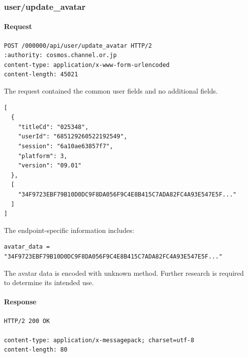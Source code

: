\subsubsection{user/update\_avatar}
\label{subsec:api_user_update_avatar}

\paragraph{Request}

\begin{lstlisting}
POST /000000/api/user/update_avatar HTTP/2
:authority: cosmos.channel.or.jp
content-type: application/x-www-form-urlencoded
content-length: 45021
\end{lstlisting}

The request contained the common user fields and no additional fields.

\begin{lstlisting}
[
  {
    "titleCd": "025348",
    "userId": "685129260522192549",
    "session": "6a10ae63857f7",
    "platform": 3,
    "version": "09.01"
  },
  [
    "34F9723EBF79B10D0DC9F8DA056F9C4E8B415C7ADA82FC4A93E547E5F..."
  ]
]
\end{lstlisting}

The endpoint-specific information includes:

\begin{lstlisting}
avatar_data = "34F9723EBF79B10D0DC9F8DA056F9C4E8B415C7ADA82FC4A93E547E5F..."
\end{lstlisting}

\begin{tcolorbox}[colback=yellow!10,colframe=orange!80!black,title=Warning]
The avatar data is encoded with unknown method.
Further research is required to determine its intended use.
\end{tcolorbox}

\newpage

\paragraph{Response}

\begin{lstlisting}
HTTP/2 200 OK

content-type: application/x-messagepack; charset=utf-8
content-length: 80
\end{lstlisting}

